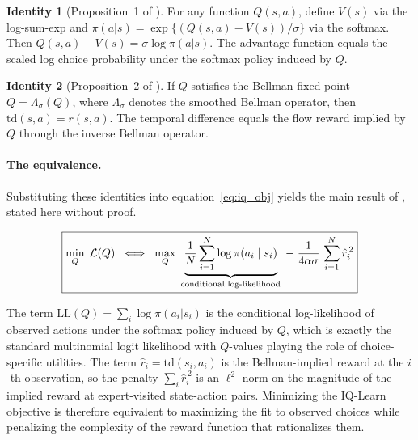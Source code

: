 \textbf{Identity 1} (Proposition~1 of \citealp{rawat2026}). For any function $Q(s,a)$, define $V(s)$ via the log-sum-exp and $\pi(a|s) = \exp\{(Q(s,a) - V(s))/\sigma\}$ via the softmax. Then $Q(s,a) - V(s) = \sigma\log\pi(a|s)$. The advantage function equals the scaled log choice probability under the softmax policy induced by $Q$.

\textbf{Identity 2} (Proposition~2 of \citealp{rawat2026}). If $Q$ satisfies the Bellman fixed point $Q = \Lambda_\sigma(Q)$, where $\Lambda_\sigma$ denotes the smoothed Bellman operator, then $\mathrm{td}(s,a) = r(s,a)$. The temporal difference equals the flow reward implied by $Q$ through the inverse Bellman operator.

\paragraph{The equivalence.}
Substituting these identities into equation~\eqref{eq:iq_obj} yields the main result of \citet{rawat2026}, stated here without proof.

\begin{equation}
\label{eq:iq_equiv}
\fbox{$\displaystyle
\min_Q\;\mathcal{L}(Q) \;\;\Longleftrightarrow\;\; \max_Q\;\underbrace{\frac{1}{N}\sum_{i=1}^{N}\log\pi(a_i \mid s_i)}_{\text{conditional log-likelihood}} \;-\; \frac{1}{4\alpha\sigma}\,\sum_{i=1}^{N}\hat{r}_i^{\,2}
$}
\end{equation}

\noindent
The term $\mathrm{LL}(Q) = \sum_i \log\pi(a_i|s_i)$ is the conditional log-likelihood of observed actions under the softmax policy induced by $Q$, which is exactly the standard multinomial logit likelihood with $Q$-values playing the role of choice-specific utilities. The term $\hat{r}_i = \mathrm{td}(s_i, a_i)$ is the Bellman-implied reward at the $i$-th observation, so the penalty $\sum_i \hat{r}_i^{\,2}$ is an $\ell^2$ norm on the magnitude of the implied reward at expert-visited state-action pairs. Minimizing the IQ-Learn objective is therefore equivalent to maximizing the fit to observed choices while penalizing the complexity of the reward function that rationalizes them.

